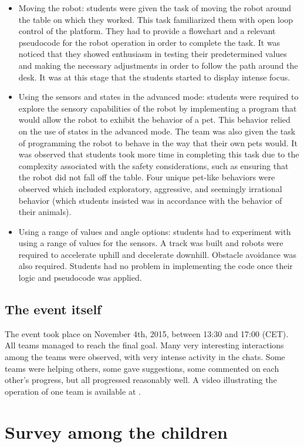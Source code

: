 \documentclass{intech-journal}
\begin{document}
\begin{itemize}
\item Moving the robot: students were given the task of moving the robot around the table on which they worked. This task familiarized them with open loop control of the platform. 
They had to provide a flowchart and a relevant pseudocode for the robot operation in order to complete the task. 
It was noticed that they showed enthusiasm in testing their predetermined values and making the necessary adjustments in order to follow the path around the desk. It was at this stage that the students started to display intense focus.
\item Using the sensors and states in the advanced mode: students were required to explore the sensory capabilities of the robot by implementing a program that would allow the robot to exhibit the behavior of a pet. 
This behavior relied on the use of states in the advanced mode. 
The team was also given the task of programming the robot to behave in the way that their own pets would.  
It was observed that students took more time in completing this task due to the complexity associated with the safety considerations, such as ensuring that the robot did not fall off the table. 
Four unique pet-like behaviors were observed which included exploratory, aggressive, and seemingly irrational behavior (which students insisted was in accordance with the behavior of their animals).
\item Using a range of values and angle options: students had to experiment with using a range of values for the sensors.
A track was built and robots were required to accelerate uphill and decelerate downhill. 
Obstacle avoidance was also required.
Students had no problem in implementing the code once their logic and pseudocode was applied.
\end{itemize}

\subsection{The event itself}

The event took place on November 4th, 2015, between 13:30 and 17:00 (CET).
All teams managed to reach the final goal.
Many very interesting interactions among the teams were observed, with very intense activity in the chats.
Some teams were helping others, some gave suggestions, some commented on each other's progress, but all progressed reasonably well.
A video illustrating the operation of one team is available at \cite{SwissinfoR2T2}.

\section{Survey among the children}
\end{document}
